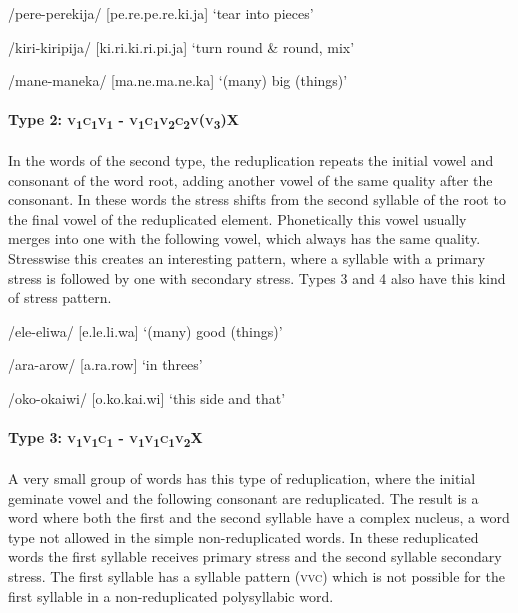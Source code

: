 /pere-perekija/  [pe.{{\textprimstress}}re.pe.{{\textprimstress}}{{\textprimstress}}re.ki.ja]  `tear into pieces'

/kiri-kiripija/  [ki.{{\textprimstress}}ri.ki.{{\textprimstress}}{{\textprimstress}}ri.pi.ja]  `turn round \& round, mix'

/mane-maneka/  [ma.{{\textprimstress}}ne.ma.{{\textprimstress}}{{\textprimstress}}ne.ka]  `(many) big (things)'

\paragraph[Type 2:  \textsc{v1c1v1} - \textsc{v1c1v2c2v(v3)x}]{Type 2:  \textsc{v}\textsubscript{1}\textsc{c}\textsubscript{1}\textsc{v}\textsubscript{1} - \textsc{v}\textsubscript{1}\textsc{c}\textsubscript{1}\textsc{v}\textsubscript{2}\textsc{c}\textsubscript{2}\textsc{v}(\textsc{v}\textsubscript{3})X}

In the words of the second type, the reduplication repeats the initial vowel and consonant of the word root, adding another vowel of the same quality after the consonant.  In these words the stress shifts from the second syllable of the root to the final vowel of the reduplicated element.  Phonetically this vowel usually merges into one with the following vowel, which always has the same quality.  Stresswise this creates an interesting pattern, where a syllable with a primary stress is followed by one with secondary stress.  Types 3 and 4 also have this kind of stress pattern.

/ele-eliwa/  [e.{{\textprimstress}}le.{{\textprimstress}}{{\textprimstress}}li.wa]  `(many) good (things)'

/ara-arow/  [a.{{\textprimstress}}ra.{{\textprimstress}}{{\textprimstress}}row]  `in threes'

/oko-okaiwi/  [o.{{\textprimstress}}ko.{{\textprimstress}}{{\textprimstress}}kai.wi]  `this side and that'

\paragraph[Type 3:  \textsc{v1v1c1} - \textsc{v1v1c1v2X}]{Type 3:  \textsc{v}\textsubscript{1}\textsc{v}\textsubscript{1}\textsc{c}\textsubscript{1} - \textsc{v}\textsubscript{1}\textsc{v}\textsubscript{1}\textsc{c}\textsubscript{1}\textsc{v}\textsubscript{2}X}

A very small group of words has this type of reduplication, where the initial geminate vowel and the following consonant are reduplicated.  The result is a word where both the first and the second syllable have a complex nucleus, a word type not allowed in the simple non-reduplicated words.  In these reduplicated words the first syllable receives primary stress and the second syllable secondary stress.  The first syllable has a syllable pattern (\textsc{vvc}) which is not possible for the first syllable in a non-reduplicated polysyllabic word.


